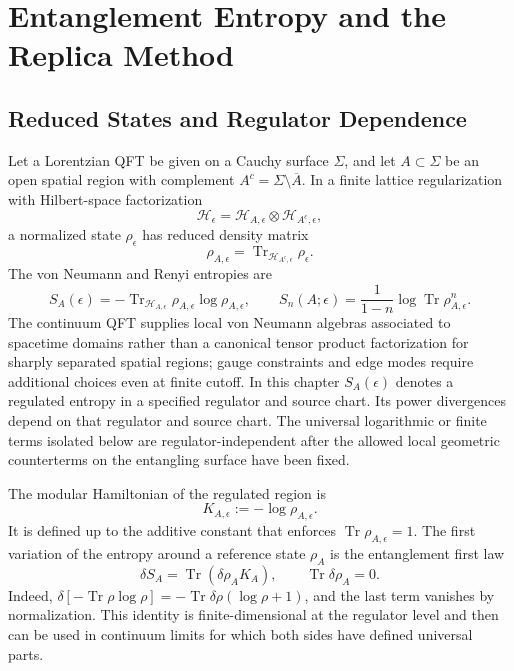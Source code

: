 \chapter{Entanglement Entropy and the Replica Method}
\label{ch:cft-entanglement-replica}
\ConventionsEuclideanCFT

\section{Reduced States and Regulator Dependence}

Let a Lorentzian QFT be given on a Cauchy surface \(\Sigma\), and let
\(A\subset\Sigma\) be an open spatial region with complement
\(A^c=\Sigma\setminus\overline A\).  In a finite lattice regularization with
Hilbert-space factorization
\[
  \mathcal H_\epsilon
  =
  \mathcal H_{A,\epsilon}\otimes\mathcal H_{A^c,\epsilon},
\]
a normalized state \(\rho_\epsilon\) has reduced density matrix
\[
  \rho_{A,\epsilon}
  =
  \operatorname{Tr}_{\mathcal H_{A^c,\epsilon}}\rho_\epsilon .
\]
The von Neumann and Renyi entropies are
\begin{equation}
  S_A(\epsilon)
  =
  -\operatorname{Tr}_{\mathcal H_{A,\epsilon}}
  \rho_{A,\epsilon}\log\rho_{A,\epsilon},
  \qquad
  S_n(A;\epsilon)
  =
  \frac{1}{1-n}
  \log\operatorname{Tr}\rho_{A,\epsilon}^n .
  \label{eq:renyi-von-neumann-definitions}
\end{equation}
The continuum QFT supplies local von Neumann algebras associated to spacetime
domains rather than a canonical tensor product factorization for sharply
separated spatial regions; gauge constraints and edge modes require additional
choices even at finite cutoff.  In this chapter
\(S_A(\epsilon)\) denotes a regulated entropy in a specified regulator and
source chart.  Its power divergences depend on that regulator and source
chart.  The universal logarithmic or finite terms isolated below are
regulator-independent after the allowed local geometric counterterms on the
entangling surface have been fixed.

The modular Hamiltonian of the regulated region is
\[
  K_{A,\epsilon}:=-\log\rho_{A,\epsilon}.
\]
It is defined up to the additive constant that enforces
\(\operatorname{Tr}\rho_{A,\epsilon}=1\).  The first variation of the entropy
around a reference state \(\rho_A\) is the entanglement first law
\begin{equation}
  \delta S_A
  =
  \operatorname{Tr}(\delta\rho_A K_A),
  \qquad
  \operatorname{Tr}\delta\rho_A=0.
  \label{eq:entanglement-first-law}
\end{equation}
Indeed,
\(\delta[-\operatorname{Tr}\rho\log\rho]
=-\operatorname{Tr}\delta\rho(\log\rho+1)\), and the last term vanishes by
normalization.  This identity is finite-dimensional at the regulator level and
then can be used in continuum limits for which both sides have defined
universal parts.

